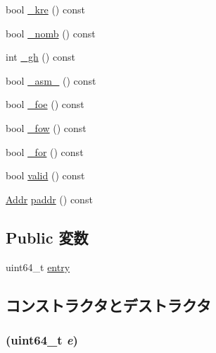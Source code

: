 \begin{DoxyCompactItemize}
\item 
bool \hyperlink{structAlphaISA_1_1PageTableEntry_a886bd53491efdc0c5f4b46e8e3642518}{\_\-kre} () const 
\item 
bool \hyperlink{structAlphaISA_1_1PageTableEntry_a19f91bef46ab704015d281ff010a3ee6}{\_\-nomb} () const 
\item 
int \hyperlink{structAlphaISA_1_1PageTableEntry_a4fd13deb4a3f8213b920514b88dda02f}{\_\-gh} () const 
\item 
bool \hyperlink{structAlphaISA_1_1PageTableEntry_a6f47582a90558c6fea1e6d1b302afcdc}{\_\-asm\_\-} () const 
\item 
bool \hyperlink{structAlphaISA_1_1PageTableEntry_ac5f2d531b0def22bd32800c958bcafc7}{\_\-foe} () const 
\item 
bool \hyperlink{structAlphaISA_1_1PageTableEntry_ac3c6c6808afd061802240a77c8f178c9}{\_\-fow} () const 
\item 
bool \hyperlink{structAlphaISA_1_1PageTableEntry_aa04a2734db47dbad23285c46220ea521}{\_\-for} () const 
\item 
bool \hyperlink{structAlphaISA_1_1PageTableEntry_a8d985300b138b6c5556ab17ed4df3b38}{valid} () const 
\item 
\hyperlink{classm5_1_1params_1_1Addr}{Addr} \hyperlink{structAlphaISA_1_1PageTableEntry_a26f24be1556c1c0ac2c42e1eff5e1197}{paddr} () const 
\end{DoxyCompactItemize}
\subsection*{Public 変数}
\begin{DoxyCompactItemize}
\item 
uint64\_\-t \hyperlink{structAlphaISA_1_1PageTableEntry_a6aac0a1a7d70f8270f9bb1222445f370}{entry}
\end{DoxyCompactItemize}


\subsection{コンストラクタとデストラクタ}
\hypertarget{structAlphaISA_1_1PageTableEntry_a9b78564edbdf997072d03154bcbe97b6}{
\subsubsection[{PageTableEntry}]{ (uint64\_\-t {\em e})}}
\label{structAlphaISA_1_1PageTableEntry_a9b78564edbdf997072d03154bcbe97b6}



